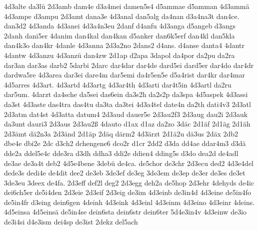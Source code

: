 {    4d3alte
    da3lü
    2d3amb
    dam4e
    d3a4mei
    damen5s4
    d5ammae
    d5amman
    4d3ammä
    4d3ampe
    d3ampu
    2d3amt
    dana3e
    4d3anal
    dan5alg
    da4nan
    d3a4na3t
    dan4ce.
    dan3d2
    4d3anda
    4d3anei
    4d3a4n3eu
    2danf
    d4anfu
    4d3anga
    d5angeb
    d3angs
    2danh
    dani5er
    4danim
    dan4kal
    dan4kan
    d5anker
    dan6k5erf
    dan4kl
    dan5kla
    dan4k3o
    dan4kr
    4danle
    4d3anna
    2d3a2no
    2dans2
    d4ans.
    d4anse
    danta4
    4dantr
    4dantw
    4d3anzu
    4d3anzü
    dan4zw
    2d1ap
    d2apa
    3dapol
    da4por
    da2pu
    da2ra
    dar3an
    dar3as
    darb2
    5darbi
    2darc
    dar4dar
    dar4de
    dard5ei
    dard5er
    dar4do
    dar4dr
    dardwa5re
    4d3area
    dar3ei
    dare4m
    dar5emi
    da4r5en5e
    d5a4rist
    dar4kr
    dar4mar
    4d5arres
    4d3art.
    4d3artd
    4d3artg
    4d3ar4th
    4d3arti
    dar4t5in
    4d3artl
    da2ru
    dar5um.
    4darzt
    da4sche
    da5sei
    das6ein
    da3s2h
    da2s2p
    da3spa
    4d5aspek
    4d3assi
    da3st
    4d3aste
    das4tra
    das4tu
    da3ta
    da3tei
    4d3a4tel
    date4n
    da2th
    dati4v3
    2d3atl
    2d3atm
    dat4st
    4d3atta
    datum4
    2d3aud
    dauer5e
    2d3au2f3
    2d3aug
    dau2i
    2d3auk
    da3unt
    dauri3
    2d3aus
    2d3au2ß
    4dauto
    d1ax
    d1az
    da2zo
    3däc
    2d1äf
    2d1äg
    2d1äh
    2d3ämt
    dä2n3a
    2d3änd
    2d1äp
    2däq
    därm2
    4d3ärzt
    2d1ä2u
    dä3us
    2däx
    2db2
    dbe4e
    dbi2e
    2dc
    d3ch2
    dchengene6
    dco2r
    d1cr
    2dd2
    d3da
    dd4ae
    ddar4m3
    d3dä
    dde2a
    ddel5e4c
    dde3ra
    d3dh
    ddha3
    ddi2e
    ddien4
    dding5s
    d3do
    dea2d
    de4adl
    de3ae
    de3a4t
    deb2
    4d5e4bene
    3debü
    de4ca.
    de5chor
    de3chr
    2d3ecu
    ded2
    4d3e4del
    dede3s
    dedi4e
    de4dit
    dee2
    de3eb
    3de3ef
    de3eg
    3de3em
    de3ep
    de3er
    de3es
    de3et
    3de3eu
    3deex
    de4fa.
    2d3eff
    def2l
    deg2
    2d3egg
    deh2a
    de5hop
    2d3ehr
    4dehyds
    de4ic
    dei6ch5er
    de5i4den
    2d3eie
    2d3eif
    2d3eig
    de3im
    4d3einb
    de3in4d
    4d3eine
    de5in4fo
    de5in4fr
    d3eing
    dein6gen
    4deinh
    4d3eink
    4d3einl
    4d3einm
    4d3eino
    4d3einr
    4deins.
    4d5einsa
    4d5einsä
    de5in4se
    dein6sta
    dein6str
    dein6ter
    5d4e3in4v
    4d3einw
    de3io
    de3i4si
    d4e3ism
    dei4sp
    de3ist
    2dekz
    del5ach
}
